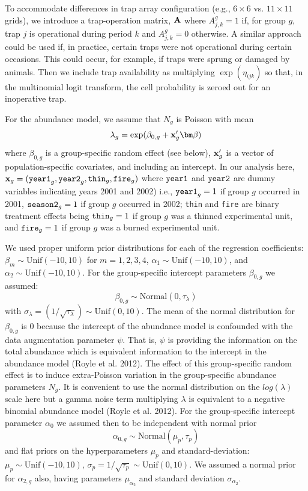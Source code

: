 To accommodate differences in trap array configuration (e.g., $6
\times 6$ vs. $11 \times 11$ grids), we introduce a trap-operation
matrix, ${\bf A}$ where $A^{g}_{j,k}=1$ if, for group $g$, trap $j$ is
operational during period $k$ and $A^{g}_{j,k} = 0$ otherwise. A
similar approach could be used if, in practice, certain traps were not
operational during certain occasions. This could occur, for example,
if traps were sprung or damaged by animals.  Then we include trap
availability as multiplying $\exp(\eta_{ijk})$ so that, in the
multinomial logit transform, the cell probability is zeroed out for an
inoperative trap.

For the abundance model, we assume that $N_{g}$ is Poisson with mean
\[
\lambda_{g} = \exp( \beta_{0,g} +  {\bf x}'_{g} {\bm \beta} )
\]
where $\beta_{0,g}$ is a group-specific random effect (see below),
 ${\bf x}'_{g}$ is a vector of population-specific covariates,
and including an intercept.  In our analysis here, ${\bf x}_{g} = 
(\mbox{\tt year1}_{g}, \mbox{\tt year2}_{g}, \mbox{\tt thin}_{g},
\mbox{\tt fire}_{g})$ where $\mbox{\tt year1}$ and $\mbox{\tt year2}$
are dummy variables indicating years 2001 and 2002) i.e., $\mbox{\tt
  year1}_{g} = 1$ if group $g$ occurred in 2001, $\mbox{\tt
  season2}_{g} = 1$ if group $g$ occurred in 2002; \mbox{\tt thin} and
\mbox{\tt fire}
are binary treatment effects being $\mbox{\tt thin}_{g}=1$ if group $g$ was a
thinned experimental unit, and $\mbox{\tt fire}_{g} = 1$ if group $g$ was a
burned experimental unit.

We used proper uniform prior distributions for each of the regression
coefficients: $\beta_{m} \sim \mbox{Unif}(-10,10)$ for $m=1,2,3,4$,
$\alpha_{1} \sim \mbox{Unif}(-10,10)$, and $\alpha_{2} \sim
\mbox{Unif}(-10,10)$. 
For 
the group-specific intercept parameters $\beta_{0,g}$  we assumed:
\[
\beta_{0,g} \sim \mbox{Normal}(0,\tau_{\lambda})
\]
with 
$\sigma_{\lambda} = (1/\sqrt{\tau_{\lambda}}) \sim
\mbox{Unif}(0,10)$.
The mean of the normal distribution for $\beta_{0,g}$ is 0 because the
intercept of the abundance model is confounded with the data
augmentation parameter $\psi$. That is, $\psi$ is providing the
information on the total abundance which is equivalent information to
the intercept in the abundance model (Royle et al. 2012).  The effect
of this group-specific random effect is to induce extra-Poisson
variation in the group-specific abundance parameters $N_{g}$. It is
convenient to use the normal distribution on the $log(\lambda)$ scale
here but a gamma noise term multiplying $\lambda$ is equivalent to a
negative binomial abundance model (Royle et al. 2012).
 For the group-specific intercept parameter
$\alpha_{0}$ we assumed then to be independent with normal prior
\[
\alpha_{0,g}\sim \mbox{Normal}(\mu_{p},\tau_{p})
\]
and flat priors on the hyperparameters $\mu_{p}$ and
standard-deviation: $\mu_{p} \sim \mbox{Unif}(-10,10)$,
$\sigma_{p}=1/\sqrt{\tau_{p}} \sim \mbox{Unif}(0,10)$.  We assumed a
normal prior for $\alpha_{2,g}$ also, having parameters $\mu_{\alpha_{2}}$
and standard deviation $\sigma_{\alpha_{2}}$.



